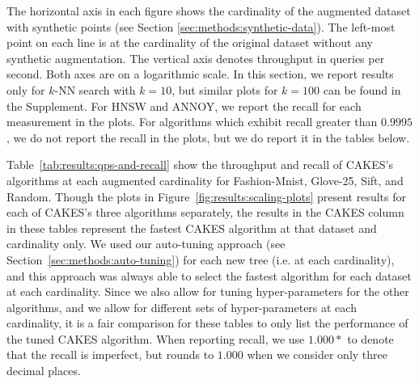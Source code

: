 The horizontal axis in each figure shows the cardinality of the augmented dataset with synthetic points (see Section \ref{sec:methods:synthetic-data}).
The left-most point on each line is at the cardinality of the original dataset without any synthetic augmentation.
The vertical axis denotes throughput in queries per second.
Both axes are on a logarithmic scale.
In this section, we report results only for $k$-NN search with $k = 10$, but similar plots for $k = 100$ can be found in the Supplement.
For HNSW and ANNOY, we report the recall for each measurement in the plots. For algorithms which exhibit recall greater than $0.9995$, we do not report the recall in the plots, but we do report it in the tables below.

Table~\ref{tab:results:qps-and-recall} show the throughput and recall of CAKES's algorithms at each augmented cardinality for Fashion-Mnist, Glove-25, Sift, and Random. 
Though the plots in Figure~\ref{fig:results:scaling-plots} present results for each of CAKES's three algorithms separately, the results in the CAKES column in these tables represent the fastest CAKES algorithm at that dataset and cardinality only.
We used our auto-tuning approach (see Section~\ref{sec:methods:auto-tuning}) for each new tree (i.e. at each cardinality), and this approach was always able to select the fastest algorithm for each dataset at each cardinality.
Since we also allow for tuning hyper-parameters for the other algorithms, and we allow for different sets of hyper-parameters at each cardinality, it is a fair comparison for these tables to only list the performance of the tuned CAKES algorithm.
When reporting recall, we use $1.000*$ to denote that the recall is imperfect, but rounds to $1.000$ when we consider only three decimal places.


